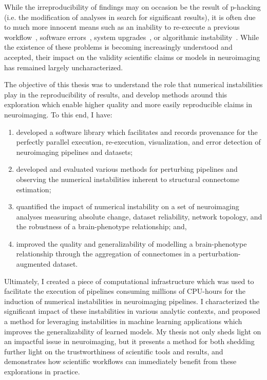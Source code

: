 While the irreproducibility of findings may on occasion be the result of p-hacking (i.e. the modification of analyses
in search for significant results), it is often due to much more innocent means such as an inability to re-execute a
previous workflow~\tocite, software errors~\tocite, system upgrades~\tocite, or algorithmic instability~\tocite. While
the existence of these problems is becoming increasingly understood and accepted, their impact on the validity
scientific claims or models in neuroimaging has remained largely uncharacterized.

The objective of this thesis was to understand the role that numerical instabilities play in the reproducibility of
results, and develop methods around this exploration which enable higher quality and more easily reproducible claims
in neuroimaging. To this end, I have:

\begin{enumerate}[label=(\roman*)]
\item developed a software library which facilitates and records provenance for the perfectly parallel execution,
re-execution, visualization, and error detection of neuroimaging pipelines and datasets;
\item developed and evaluated various methods for perturbing pipelines and observing the numerical instabilities
inherent to structural connectome estimation;
\item quantified the impact of numerical instability on a set of neuroimaging analyses measuring absolute change,
dataset reliability, network topology, and the robustness of a brain-phenotype relationship; and,
\item improved the quality and generalizability of modelling a brain-phenotype relationship through the aggregation of
connectomes in a perturbation-augmented dataset.
\end{enumerate}

Ultimately, I created a piece of computational infrastructure which was used to facilitate the execution of pipelines
consuming millions of CPU-hours for the induction of numerical instabilities in neuroimaging pipelines. I characterized
the significant impact of these instabilities in various analytic contexts, and proposed a method for leveraging
instabilities in machine learning applications which improves the generalizability of learned models. My thesis not
only sheds light on an impactful issue in neuroimaging, but it presents a method for both shedding further light on
the trustworthiness of scientific tools and results, and demonstrates how scientific workflows can immediately benefit
from these explorations in practice.

